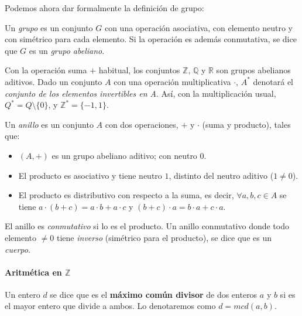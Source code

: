 Podemos ahora dar formalmente la definición de grupo:

\begin{definition}
	Un \textit{grupo} es un conjunto $G$ con una operación asociativa, con elemento neutro y con simétrico para cada elemento. Si la operación es además conmutativa, se dice que $G$ es un \textit{grupo abeliano}.
\end{definition}

Con la operación suma $+$ habitual, los conjuntos $\mathbb{Z}$, $\mathbb{Q}$ y $\mathbb{R}$ son grupos abelianos aditivos. Dado un conjunto $A$ con una operación multiplicativa $\cdot$, $A^*$ denotará el \textit{conjunto de los elementos invertibles en A}. Así, con la multiplicación usual, $Q^* = Q \setminus \{0\}$, y $\mathbb{Z}^* = \{-1,1\}$.

\hfil

\begin{definition}
	Un \textit{anillo} es un conjunto $A$ con dos operaciones, $+$ y $\cdot$ (suma y producto), tales que:
	\begin{itemize}
		\item $(A,+)$ es un grupo abeliano aditivo; con neutro $0$.
		\item El producto es asociativo y tiene neutro $1$, distinto del neutro aditivo ($1\neq 0$).
		\item El producto es distributivo con respecto a la suma, es decir, $\forall a,b,c \in A$ se tiene $a\cdot(b+c)=a\cdot b + a\cdot c$ y $(b+c)\cdot a = b\cdot a + c\cdot a$.
	\end{itemize}

	El anillo es \textit{conmutativo} si lo es el producto. Un anillo conmutativo donde todo elemento $\neq 0$ tiene \textit{inverso} (simétrico para el producto), se dice que es un \textit{cuerpo}.
	
\end{definition}




\hfil


\paragraph{Aritmética en $\mathbb{Z}$}

\begin{definition}
	Un entero $d$ se dice que es el \textbf{máximo común divisor} de dos enteros $a$ y $b$ si es el mayor entero que divide a ambos. Lo denotaremos como $d=mcd(a,b)$.
\end{definition}

